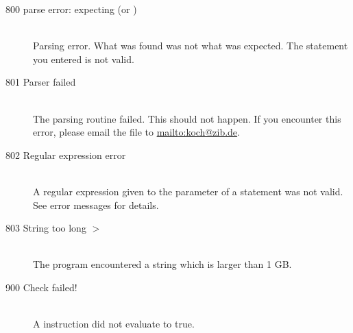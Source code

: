 \begin{description}
\item[800 parse error: expecting  (or )]\ \\
  Parsing error. What was found was not what was expected.
  The statement you entered is not valid.
\item[801 Parser failed]\ \\
  The parsing routine failed. This should not happen. If you encounter
  this error, please email the  file to \url{mailto:koch@zib.de}.
\item[802 Regular expression error]\ \\
  A regular expression given to the  parameter of a
   statement was not valid. See error messages for details.
\item[803 String too long  $>$ ]\ \\
  The program encountered a string which is larger than 1 GB. 
%
%
\item[900 Check failed!]\ \\
  A  instruction did not evaluate to true. 
\end{description}

